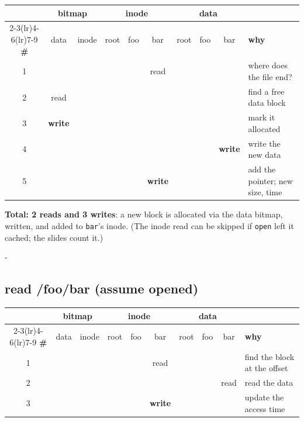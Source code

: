 \documentclass[11pt,a4paper]{article}
\makeatletter
\newcommand{\keepspace}[1]{\par\penalty-100\begingroup
  \setlength{\dimen@}{#1}\dimen@ii\pagegoal\advance\dimen@ii-\pagetotal
  \ifdim\dimen@>\dimen@ii\ifdim\dimen@ii>\z@\vfil\fi\break\fi\endgroup}
\makeatother
\begin{document}
\begin{center}
\small
\setlength{\tabcolsep}{3.5pt}
\renewcommand{\arraystretch}{1.18}
\begin{tabularx}{\linewidth}{@{}c*{8}{c}X@{}}
  \toprule
  & \multicolumn{2}{c}{\textbf{bitmap}} & \multicolumn{3}{c}{\textbf{inode}} & \multicolumn{3}{c}{\textbf{data}} & \\
  \cmidrule(lr){2-3}\cmidrule(lr){4-6}\cmidrule(lr){7-9}
  \textbf{\#} & data & inode & root & foo & bar & root & foo & bar & \textbf{why} \\
  \midrule
  1 &  &  &  &  & read &  &  &  & where does the file end? \\
  2 & read &  &  &  &  &  &  &  & find a free data block \\
  3 & \textbf{write} &  &  &  &  &  &  &  & mark it allocated \\
  4 &  &  &  &  &  &  &  & \textbf{write} & write the new data \\
  5 &  &  &  &  & \textbf{write} &  &  &  & add the pointer; new size, time \\
  \bottomrule
\end{tabularx}
\end{center}

\noindent\textbf{Total: 2 reads and 3 writes}: a new block is allocated via
the data bitmap, written, and added to \texttt{bar}'s inode. (The inode read
can be skipped if \texttt{open} left it cached; the slides count it.)

\keepspace{8\baselineskip}
\subsection{read /foo/bar (assume opened)}

\begin{center}
\small
\setlength{\tabcolsep}{3.5pt}
\renewcommand{\arraystretch}{1.18}
\begin{tabularx}{\linewidth}{@{}c*{8}{c}X@{}}
  \toprule
  & \multicolumn{2}{c}{\textbf{bitmap}} & \multicolumn{3}{c}{\textbf{inode}} & \multicolumn{3}{c}{\textbf{data}} & \\
  \cmidrule(lr){2-3}\cmidrule(lr){4-6}\cmidrule(lr){7-9}
  \textbf{\#} & data & inode & root & foo & bar & root & foo & bar & \textbf{why} \\
  \midrule
  1 &  &  &  &  & read &  &  &  & find the block at the offset \\
  2 &  &  &  &  &  &  &  & read & read the data \\
  3 &  &  &  &  & \textbf{write} &  &  &  & update the access time \\
  \bottomrule
\end{tabularx}
\end{center}
\end{document}
